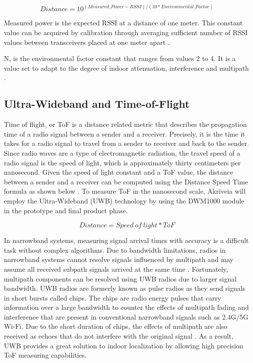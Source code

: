 \begin{equation*}
    Distance = 10^{(Measured\_Power - RSSI)/(10*Environmental\_Factor)}
\end{equation*}

\medskip
Measured power is the expected RSSI at a distance of one meter. This constant value can be acquired by calibration through averaging sufficient number of RSSI values between transceivers placed at one meter apart \cite{R2-5-3}.

\medskip
N, is the environmental factor constant that ranges from values 2 to 4. It is a value set to adapt to the degree of indoor attenuation, interference and multipath \cite{R2-5-3}.



\pagebreak
\subsection{Ultra-Wideband and Time-of-Flight}
\medskip
Time of flight, or ToF is a distance related metric that describes the propagation time of a radio signal between a sender and a receiver. Precisely, it is the time it takes for a radio signal to travel from a sender to receiver and back to the sender. Since radio waves are a type of electromagnetic radiation, the travel speed of a radio signal is the speed of light, which is approximately thirty centimeters per nanosecond. Given the speed of light constant and a ToF value, the distance between a sender and a receiver can be computed using the Distance Speed Time formula as shown below \cite{R2-5-1}. To measure ToF in the nanosecond scale, Akriveia will employ the Ultra-Wideband (UWB) technology by using the DWM1000 module in the prototype and final product phase.

\begin{equation*}
    Distance = Speed\:of\:light * ToF
\end{equation*}


\medskip
In narrowband systems, measuring signal arrival times with accuracy is a difficult task without complex algorithms. Due to bandwidth limitations, radios in narrowband systems cannot resolve signals influenced by multipath and may assume all received subpath signals arrived at the same time \cite{R2-5-2}. Fortunately, multipath components can be resolved using UWB radios due to larger signal bandwidth. UWB radios are formerly known as pulse radios as they send signals in short bursts called chips. The chips are radio energy pulses that carry information over a large bandwidth to counter the effects of multipath fading and interference that are present in conventional narrowband signals such as 2.4G/5G Wi-Fi. Due to the short duration of chips, the effects of multipath are also received as echoes that do not interfere with the original signal \cite{R2-5-1}. As a result, UWB provides a great solution to indoor localization by allowing high precision ToF measuring capabilities.



